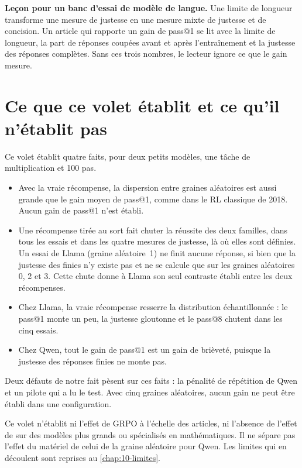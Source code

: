 \begin{keybox}
\textbf{Leçon pour un banc d'essai de modèle de langue.} Une limite de longueur transforme une mesure
de justesse en une mesure mixte de justesse et de concision. Un article qui rapporte un gain de
pass@1 se lit avec la limite de longueur, la part de réponses coupées avant et après
l'entraînement et la justesse des réponses complètes. Sans ces trois nombres, le lecteur ignore ce
que le gain mesure.
\end{keybox}

\section{Ce que ce volet établit et ce qu'il n'établit pas}
\label{sec:llm-portee}

Ce volet établit quatre faits, pour deux petits modèles, une tâche de multiplication et 100 pas.
\begin{itemize}
  \item Avec la vraie récompense, la dispersion entre graines aléatoires est aussi grande que le gain moyen de
    pass@1, comme dans le RL classique de 2018. Aucun gain de pass@1 n'est établi.
  \item Une récompense tirée au sort fait chuter la réussite des deux familles, dans tous les essais et dans
    les quatre mesures de justesse, là où elles sont définies. Un essai de Llama (graine aléatoire~1) ne finit
    aucune réponse, si bien que la justesse des finies n'y existe pas et ne se calcule que sur les graines
    aléatoires 0, 2 et 3. Cette chute donne à Llama son seul contraste établi entre les deux récompenses.
  \item Chez Llama, la vraie récompense resserre la distribution échantillonnée : le pass@1 monte un peu, la
    justesse gloutonne et le pass@8 chutent dans les cinq essais.
  \item Chez Qwen, tout le gain de pass@1 est un gain de brièveté, puisque la justesse des réponses finies ne
    monte pas.
\end{itemize}
Deux défauts de notre fait pèsent sur ces faits : la pénalité de répétition de Qwen et un pilote qui a lu le
test. Avec cinq graines aléatoires, aucun gain ne peut être établi dans une configuration. 

Ce volet n'établit ni l'effet de GRPO à l'échelle des articles, ni l'absence de l'effet de
\textcite{shao2025spurious} sur des modèles plus grands ou spécialisés en mathématiques. Il ne
sépare pas l'effet du matériel de celui de la graine aléatoire pour Qwen. Les limites qui en
découlent sont reprises au \cref{chap:10-limites}.
